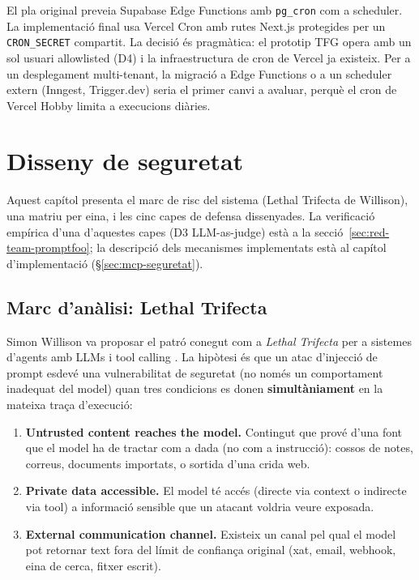 El pla original preveia Supabase Edge Functions amb \texttt{pg\_cron} com a scheduler. La implementació final usa Vercel Cron amb rutes Next.js protegides per un \texttt{CRON\_SECRET} compartit. La decisió és pragmàtica: el prototip TFG opera amb un sol usuari allowlisted (D4) i la infraestructura de cron de Vercel ja existeix. Per a un desplegament multi-tenant, la migració a Edge Functions o a un scheduler extern (Inngest, Trigger.dev) seria el primer canvi a avaluar, perquè el cron de Vercel Hobby limita a execucions diàries.

\section{Disseny de seguretat}
\label{sec:disseny-seguretat}

Aquest capítol presenta el marc de risc del sistema (Lethal Trifecta de Willison), una matriu per eina, i les cinc capes de defensa dissenyades. La verificació empírica d'una d'aquestes capes (D3 LLM-as-judge) està a la secció~\ref{sec:red-team-promptfoo}; la descripció dels mecanismes implementats està al capítol d'implementació (\S\ref{sec:mcp-seguretat}).

\subsection{Marc d'anàlisi: Lethal Trifecta}
\label{sec:trifecta}

Simon Willison va proposar el patró conegut com a \emph{Lethal Trifecta} per a sistemes d'agents amb LLMs i tool calling \parencite{willison2025trifecta}. La hipòtesi és que un atac d'injecció de prompt esdevé una vulnerabilitat de seguretat (no només un comportament inadequat del model) quan tres condicions es donen \textbf{simultàniament} en la mateixa traça d'execució:

\begin{enumerate}
    \item \textbf{Untrusted content reaches the model.} Contingut que prové d'una font que el model ha de tractar com a dada (no com a instrucció): cossos de notes, correus, documents importats, o sortida d'una crida web.
    \item \textbf{Private data accessible.} El model té accés (directe via context o indirecte via tool) a informació sensible que un atacant voldria veure exposada.
    \item \textbf{External communication channel.} Existeix un canal pel qual el model pot retornar text fora del límit de confiança original (xat, email, webhook, eina de cerca, fitxer escrit).
\end{enumerate}

